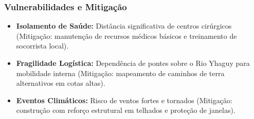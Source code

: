 \subsubsection{Vulnerabilidades e
Mitigação}

\begin{itemize}
\tightlist
\item
  \textbf{Isolamento de Saúde:} Distância significativa de centros
  cirúrgicos (Mitigação: manutenção de recursos médicos básicos e
  treinamento de socorrista local).
\item
  \textbf{Fragilidade Logística:} Dependência de pontes sobre o Rio
  Yhaguy para mobilidade interna (Mitigação: mapeamento de caminhos de
  terra alternativos em cotas altas).
\item
  \textbf{Eventos Climáticos:} Risco de ventos fortes e tornados
  (Mitigação: construção com reforço estrutural em telhados e proteção
  de janelas).
\end{itemize}

